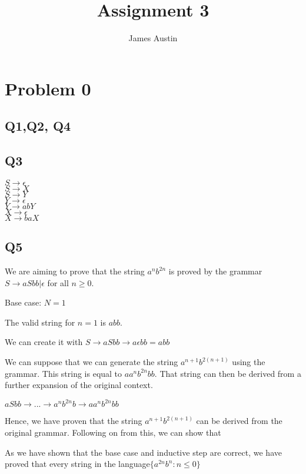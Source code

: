 \documentclass[11pt, oneside]{article}   	%
\title{Assignment 3}
\author{James Austin}
\begin{document}
\maketitle
\section{Problem 0}
\subsection{Q1,Q2, Q4}


\subsection{Q3}
$S\rightarrow \epsilon$\\
$S\rightarrow X$\\
$S\rightarrow Y$\\
$Y\rightarrow \epsilon$\\
$Y\rightarrow abY$\\
$X\rightarrow \epsilon$\\
$X\rightarrow baX$\\

\subsection{Q5}

We are aiming to prove that the string $a^nb^{2n}$ is proved by the grammar $S \rightarrow aSbb | \epsilon$ for all $n \geq 0$.

Base case: $N = 1$

The valid string for $n = 1$ is $abb$.

We can create it with $S \rightarrow aSbb \rightarrow a\epsilon bb = abb$

We can suppose that we can generate the string $a^{n+1}b^{2(n+1)}$ using the grammar. This string is equal to $aa^nb^{2n}bb$. That string can then be derived from a further expansion of the original context.

$aSbb \rightarrow ... \rightarrow a^nb^{2n}b \rightarrow aa^nb^{2n}bb$

Hence, we have proven that the string  $a^{n+1}b^{2(n+1)}$ can be derived from the original grammar. Following on from this, we can show that 

As we have shown that the base case and inductive step are correct, we have proved that every string in the language$\{a^{2n}b^n: n\leq 0 \}$ 

\end{document}
